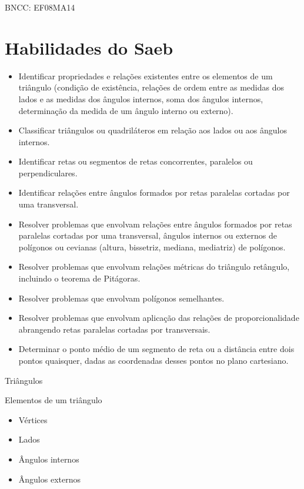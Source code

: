 BNCC: EF08MA14

\section{Habilidades do Saeb}

\begin{itemize}

\item 
  Identificar propriedades e relações existentes entre os elementos de
  um triângulo (condição de existência, relações de ordem entre as
  medidas dos lados e as medidas dos ângulos internos, soma dos ângulos
  internos, determinação da medida de um ângulo interno ou externo).

\item 
  Classificar triângulos ou quadriláteros em relação aos lados ou aos
  ângulos internos.

\item 
  Identificar retas ou segmentos de retas concorrentes, paralelos ou
  perpendiculares.

\item 
  Identificar relações entre ângulos formados por retas paralelas
  cortadas por uma transversal.

\item 
  Resolver problemas que envolvam relações entre ângulos formados por
  retas paralelas cortadas por uma transversal, ângulos internos ou
  externos de polígonos ou cevianas (altura, bissetriz, mediana,
  mediatriz) de polígonos.

\item 
  Resolver problemas que envolvam relações métricas do triângulo
  retângulo, incluindo o teorema de Pitágoras.

\item 
  Resolver problemas que envolvam polígonos semelhantes.

\item 
  Resolver problemas que envolvam aplicação das relações de
  proporcionalidade abrangendo retas paralelas cortadas por
  transversais.

\item 
  Determinar o ponto médio de um segmento de reta ou a distância entre
  dois pontos quaisquer, dadas as coordenadas desses pontos no plano
  cartesiano.
\end{itemize}

Triângulos

Elementos de um triângulo

\begin{itemize}

\item 
  Vértices

\item 
  Lados

\item 
  Ângulos internos

\item 
  Ângulos externos
\end{itemize}

